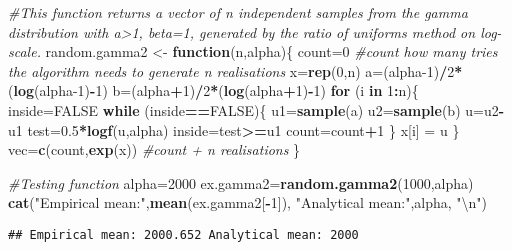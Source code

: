 \documentclass[]{article}
\newenvironment{Shaded}{\begin{snugshade}}{\end{snugshade}}
\newcommand{\CharTok}[1]{\textcolor[rgb]{0.31,0.60,0.02}{#1}}
\newcommand{\CommentTok}[1]{\textcolor[rgb]{0.56,0.35,0.01}{\textit{#1}}}
\newcommand{\ControlFlowTok}[1]{\textcolor[rgb]{0.13,0.29,0.53}{\textbf{#1}}}
\newcommand{\DecValTok}[1]{\textcolor[rgb]{0.00,0.00,0.81}{#1}}
\newcommand{\FloatTok}[1]{\textcolor[rgb]{0.00,0.00,0.81}{#1}}
\newcommand{\KeywordTok}[1]{\textcolor[rgb]{0.13,0.29,0.53}{\textbf{#1}}}
\newcommand{\NormalTok}[1]{#1}
\newcommand{\OperatorTok}[1]{\textcolor[rgb]{0.81,0.36,0.00}{\textbf{#1}}}
\newcommand{\OtherTok}[1]{\textcolor[rgb]{0.56,0.35,0.01}{#1}}
\newcommand{\StringTok}[1]{\textcolor[rgb]{0.31,0.60,0.02}{#1}}
\begin{document}
\begin{Shaded}
\begin{Highlighting}[]
\CommentTok{#This function returns a vector of n independent samples from the gamma distribution with a>1, beta=1, generated by the ratio of uniforms method on log-scale. }
\NormalTok{random.gamma2 <-}\StringTok{ }\ControlFlowTok{function}\NormalTok{(n,alpha)\{}
\NormalTok{  count=}\DecValTok{0} \CommentTok{#count how many tries the algorithm needs to generate n realisations}
\NormalTok{  x=}\KeywordTok{rep}\NormalTok{(}\DecValTok{0}\NormalTok{,n)}
\NormalTok{  a=(alpha}\DecValTok{-1}\NormalTok{)}\OperatorTok{/}\DecValTok{2}\OperatorTok{*}\NormalTok{(}\KeywordTok{log}\NormalTok{(alpha}\DecValTok{-1}\NormalTok{)}\OperatorTok{-}\DecValTok{1}\NormalTok{)}
\NormalTok{  b=(alpha}\OperatorTok{+}\DecValTok{1}\NormalTok{)}\OperatorTok{/}\DecValTok{2}\OperatorTok{*}\NormalTok{(}\KeywordTok{log}\NormalTok{(alpha}\OperatorTok{+}\DecValTok{1}\NormalTok{)}\OperatorTok{-}\DecValTok{1}\NormalTok{)}
  \ControlFlowTok{for}\NormalTok{ (i }\ControlFlowTok{in} \DecValTok{1}\OperatorTok{:}\NormalTok{n)\{}
\NormalTok{    inside=}\OtherTok{FALSE}
    \ControlFlowTok{while}\NormalTok{ (inside}\OperatorTok{==}\OtherTok{FALSE}\NormalTok{)\{}
\NormalTok{      u1=}\KeywordTok{sample}\NormalTok{(a) }
\NormalTok{      u2=}\KeywordTok{sample}\NormalTok{(b)}
\NormalTok{      u=u2}\OperatorTok{-}\NormalTok{u1}
\NormalTok{      test=}\FloatTok{0.5}\OperatorTok{*}\KeywordTok{logf}\NormalTok{(u,alpha)}
\NormalTok{      inside=test}\OperatorTok{>=}\NormalTok{u1 }
\NormalTok{      count=count}\OperatorTok{+}\DecValTok{1}
\NormalTok{    \}}
\NormalTok{    x[i] =}\StringTok{ }\NormalTok{u}
\NormalTok{  \}}
\NormalTok{  vec=}\KeywordTok{c}\NormalTok{(count,}\KeywordTok{exp}\NormalTok{(x)) }\CommentTok{#count + n realisations}
\NormalTok{\}}

\CommentTok{#Testing function }
\NormalTok{alpha=}\DecValTok{2000}
\NormalTok{ex.gamma2=}\KeywordTok{random.gamma2}\NormalTok{(}\DecValTok{1000}\NormalTok{,alpha)}
\KeywordTok{cat}\NormalTok{(}\StringTok{"Empirical mean:"}\NormalTok{,}\KeywordTok{mean}\NormalTok{(ex.gamma2[}\OperatorTok{-}\DecValTok{1}\NormalTok{]), }\StringTok{"Analytical mean:"}\NormalTok{,alpha, }\StringTok{"}\CharTok{\textbackslash{}n}\StringTok{"}\NormalTok{)}
\end{Highlighting}
\end{Shaded}

\begin{verbatim}
## Empirical mean: 2000.652 Analytical mean: 2000
\end{verbatim}
\end{document}
